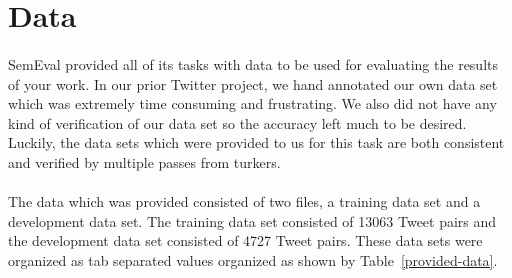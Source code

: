 \documentclass[11pt,letterpaper]{article}
\begin{document}

\section{Data}
\paragraph{}
SemEval provided all of its tasks with data to be used for evaluating the results of your work. In our prior Twitter project, we hand annotated our own data set which was extremely time consuming and frustrating. We also did not have any kind of verification of our data set so the accuracy left much to be desired. Luckily, the data sets which were provided to us for this task are both consistent and verified by multiple passes from turkers.
\paragraph{}
The data which was provided consisted of two files, a training data set and a development data set. The training data set consisted of 13063 Tweet pairs and the development data set consisted of 4727 Tweet pairs. These data sets were organized as tab separated values organized as shown by Table~\ref{provided-data}.
\end{document}
